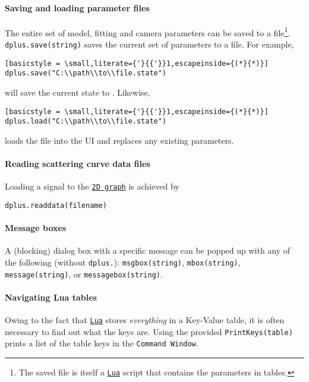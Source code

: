 \documentclass[../D+Manual.tex]{subfiles}
\begin{document}
\paragraph{Saving and loading parameter files}
The entire set of model, fitting and camera parameters can be saved to a file\footnote{The saved file is itself a \href{http://www.lua.org/}{\texttt{Lua}} script that contains the parameters in tables.}.
\lstinline|dplus.save(string)| saves the current set of parameters to a file. For example,
\begin{lstlisting}[basicstyle = \small,literate={'}{{'}}1,escapeinside={(*}{*)}]
dplus.save("C:\\path\\to\\file.state")
\end{lstlisting}
will save the current state to . Likewise, 
\begin{lstlisting}[basicstyle = \small,literate={'}{{'}}1,escapeinside={(*}{*)}]
dplus.load("C:\\path\\to\\file.state")
\end{lstlisting}
loads the file into the UI and replaces any existing parameters.

\paragraph{Reading scattering curve data files}
Loading a signal to the \hyperref[sec:2DGraph]{\texttt{2D graph}} is achieved by
\begin{lstlisting}
dplus.readdata(filename)
\end{lstlisting}

\paragraph{Message boxes}
A (blocking) dialog box with a specific message can be popped up with any of the following (without \lstinline{dplus.}):
\lstinline{msgbox(string)},
\lstinline{mbox(string)},
\lstinline{message(string)}, or
\lstinline{messagebox(string)}.


\paragraph{Navigating Lua tables} \label{sec:par:printKeys}
Owing to the fact that \href{http://www.lua.org/}{\texttt{Lua}} stores \textit{everything} in a Key-Value table, it is often necessary to find out what the keys are. Using the provided \lstinline{PrintKeys(table)} prints a list of the table keys in the \texttt{Command Window}.
\end{document}
